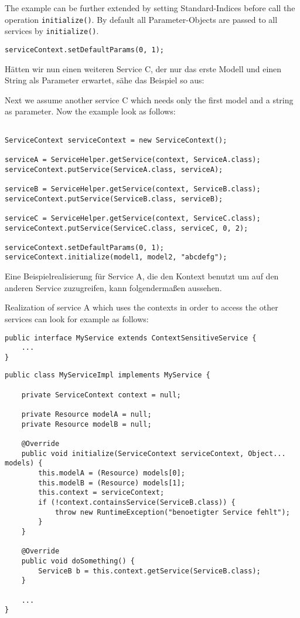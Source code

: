 \documentclass[10pt,a4paper]{scrartcl}
\providecommand{\deutsch}[1]{#1}
\providecommand{\englisch}[1]{{\sffamily #1}}
\begin{document}
\englisch{The example can be further extended by setting Standard-Indices before call the operation \texttt{initialize()}. By default all Parameter-Objects are passed to all services by \texttt{initialize()}.}

\begin{lstlisting}
serviceContext.setDefaultParams(0, 1);
\end{lstlisting}

\deutsch{Hätten wir nun einen weiteren Service C, der nur das erste Modell und einen
String als Parameter erwartet, sähe das Beispiel so aus:}

\englisch{Next we assume another service C which needs only the first model and a string as parameter. Now the example look as follows:}

\begin{lstlisting}

ServiceContext serviceContext = new ServiceContext();

serviceA = ServiceHelper.getService(context, ServiceA.class); 
serviceContext.putService(ServiceA.class, serviceA);

serviceB = ServiceHelper.getService(context, ServiceB.class); 
serviceContext.putService(ServiceB.class, serviceB);

serviceC = ServiceHelper.getService(context, ServiceC.class); 
serviceContext.putService(ServiceC.class, serviceC, 0, 2);

serviceContext.setDefaultParams(0, 1);
serviceContext.initialize(model1, model2, "abcdefg");
\end{lstlisting}

\deutsch{Eine Beispielrealisierung für Service A, die den Kontext benutzt um auf den anderen Service
zuzugreifen, kann folgendermaßen aussehen.}

\englisch{Realization of service A which uses the contexts in order to access the other services can look for example as follows:}

\begin{lstlisting}
public interface MyService extends ContextSensitiveService {
	...
}
\end{lstlisting}
\begin{lstlisting}
public class MyServiceImpl implements MyService {

	private ServiceContext context = null;

	private Resource modelA = null;
	private Resource modelB = null;

	@Override
	public void initialize(ServiceContext serviceContext, Object... models) {
		this.modelA = (Resource) models[0];
		this.modelB = (Resource) models[1];
		this.context = serviceContext;
		if (!context.containsService(ServiceB.class)) {
			throw new RuntimeException("benoetigter Service fehlt");
		}
	}

	@Override
	public void doSomething() {
		ServiceB b = this.context.getService(ServiceB.class);
	}

	...
}
\end{lstlisting}
\end{document}
